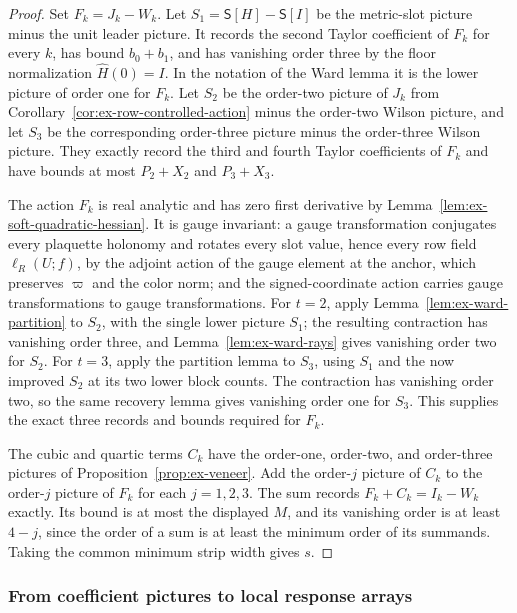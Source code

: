 \begin{proof}
Set $F_k=J_k-W_k$. Let $S_1=\mathsf S[H]-\mathsf S[I]$ be the
metric-slot picture minus the unit leader picture. It records the second
Taylor coefficient of $F_k$ for every $k$, has bound $b_0+b_1$, and has
vanishing order three by the floor normalization $\widehat H(0)=I$. In
the notation of the Ward lemma it is the lower picture of order one for
$F_k$. Let $S_2$ be the order-two picture of $J_k$
from Corollary~\ref{cor:ex-row-controlled-action} minus the order-two
Wilson picture, and let $S_3$ be the corresponding order-three picture
minus the order-three Wilson picture. They exactly record the third and
fourth Taylor coefficients of $F_k$ and have bounds at most $P_2+X_2$
and $P_3+X_3$.

The action $F_k$ is real analytic and has zero first derivative by
Lemma~\ref{lem:ex-soft-quadratic-hessian}. It is gauge invariant: a
gauge transformation conjugates every plaquette holonomy and rotates
every slot value, hence every row field $\ell_R(U;f)$, by the adjoint
action of the gauge element at the anchor, which preserves $\varpi$
and the color norm; and the signed-coordinate action carries gauge
transformations to gauge transformations. For
$t=2$, apply Lemma~\ref{lem:ex-ward-partition} to $S_2$, with the single
lower picture $S_1$; the resulting contraction has vanishing order three,
and Lemma~\ref{lem:ex-ward-rays} gives vanishing order two for $S_2$.
For $t=3$, apply the partition lemma to $S_3$, using $S_1$ and the now
improved $S_2$ at its two lower block counts. The contraction has
vanishing order two, so the same recovery lemma gives vanishing order one
for $S_3$. This supplies the exact three records and bounds required for
$F_k$.

The cubic and quartic terms $C_k$ have the order-one, order-two, and
order-three pictures of Proposition~\ref{prop:ex-veneer}. Add the
order-$j$ picture of $C_k$ to the order-$j$ picture of $F_k$ for each
$j=1,2,3$. The sum records
$F_k+C_k=I_k-W_k$ exactly. Its bound is at most the displayed $M$,
and its vanishing order is at least $4-j$, since the order of a sum is
at least the minimum order of its summands. Taking the common minimum
strip width gives $s$.
\end{proof}

\subsubsection{From coefficient pictures to local response arrays}

